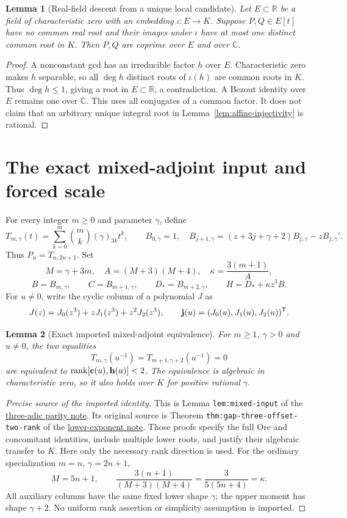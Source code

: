 \documentclass[11pt]{article}
\newtheorem{lemma}{Lemma}
\begin{document}
\begin{lemma}[Real-field descent from a unique local candidate]
\label{lem:real-field-descent}
Let $E\subset\mathbb R$ be a field of characteristic zero with an
embedding $\iota:E\longrightarrow K$.
Suppose $P,Q\in E[t]$ have no common real root and their images
under $\iota$ have at most one distinct common root in $K$.
Then $P,Q$ are coprime over $E$ and over $\mathbb C$.
\end{lemma}
\begin{proof}
A nonconstant gcd has an irreducible factor $h$ over $E$.
Characteristic zero makes $h$ separable, so all $\deg h$ distinct
roots of $\iota(h)$ are common roots in $K$.
Thus $\deg h\le1$, giving a root in $E\subset\mathbb R$,
a contradiction. A Bezout identity over $E$ remains one over
$\mathbb C$.
This uses all conjugates of a common factor. It does not claim
that an arbitrary unique integral root in
Lemma~\ref{lem:affine-injectivity} is rational.
\end{proof}

\section{The exact mixed-adjoint input and forced scale}
For every integer $m\ge0$ and parameter $\gamma$, define
\[
 T_{m,\gamma}(t)=\sum_{k=0}^m\binom mk(\gamma)_{3k}t^k,\qquad
 B_{0,\gamma}=1,\quad
 B_{j+1,\gamma}=(z+3j+\gamma+2)B_{j,\gamma}
                       -zB_{j,\gamma}' .
\]
Thus $P_n=T_{n,2n+1}$. Set
\[
 M=\gamma+3m,\quad A=(M+3)(M+4),\quad
 \kappa=\frac{3(m+1)}{A},
\]
\[
 B=B_{m,\gamma},\qquad C=B_{m+1,\gamma},\qquad
 D_*=B_{m+2,\gamma},\qquad H=D_*+\kappa z^3B.
\]
For $u\ne0$, write the cyclic column of a polynomial $J$ as
\[
 J(z)=J_0(z^3)+zJ_1(z^3)+z^2J_2(z^3),\qquad
 {\bf j}(u)=(J_0(u),J_1(u),J_2(u))^{\mathsf T}.
\]
\begin{lemma}[Exact imported mixed-adjoint equivalence]\label{lem:mixed-input}
For $m\ge1$, $\gamma>0$ and $u\ne0$, the two equalities
\[
 T_{m,\gamma}(u^{-1})=T_{m+1,\gamma+2}(u^{-1})=0
\]
are equivalent to $\operatorname{rank}[{\bf c}(u),{\bf h}(u)]<2$.
The equivalence is algebraic in characteristic zero, so it also holds
over $K$ for positive rational $\gamma$.
\end{lemma}
\begin{proof}[Precise source of the imported identity]
This is Lemma \texttt{lem:mixed-input} of the
\href{QUINTIC_THREE_ADIC_PARITY_REDUCTION.tex}{three-adic parity note}.
Its original source is Theorem
\texttt{thm:gap-three-}\allowbreak\texttt{offset-two-rank} of the
\href{lower_exponent_initial_and_boundary.tex}{lower-exponent note}.
Those proofs specify the full Ore and concomitant identities,
include multiple lower roots, and justify their algebraic transfer
to $K$. Here only the necessary rank direction is used.
For the ordinary specialization $m=n$, $\gamma=2n+1$,
\[
 M=5n+1,\qquad
 \frac{3(n+1)}{(M+3)(M+4)}
 =\frac3{5(5n+4)}=\kappa .
\]
All auxiliary columns have the same fixed lower shape $\gamma$;
the upper moment has shape $\gamma+2$.
No uniform rank assertion or simplicity assumption is imported.
\end{proof}
\end{document}
